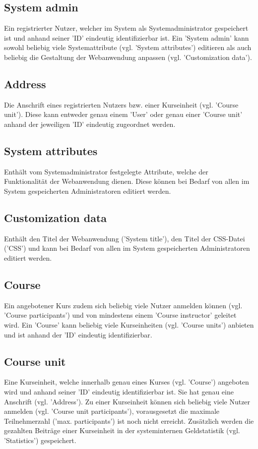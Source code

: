 \subsection{System admin}
Ein registrierter Nutzer, welcher im System als Systemadministrator gespeichert ist und anhand seiner 'ID' eindeutig identifizierbar ist. Ein 'System admin' kann sowohl beliebig viele Systemattribute (vgl. 'System attributes') editieren als auch beliebig die Gestaltung der Webanwendung anpassen (vgl. 'Customization data').

\subsection{Address}
Die Anschrift eines registrierten Nutzers bzw. einer Kurseinheit (vgl. 'Course unit'). Diese kann entweder genau einem 'User' oder genau einer 'Course unit' anhand der jeweiligen 'ID' eindeutig zugeordnet werden.

\subsection{System attributes}
Enthält vom Systemadministrator festgelegte Attribute, welche der Funktionalität der Webanwendung dienen. Diese können bei Bedarf von allen im System gespeicherten Administratoren editiert werden.

\subsection{Customization data}
Enthält den Titel der Webanwendung ('System title'), den Titel der CSS-Datei ('CSS') und kann bei Bedarf von allen im System gespeicherten Administratoren editiert werden.

\subsection{Course}
Ein angebotener Kurs zudem sich beliebig viele Nutzer anmelden können (vgl. 'Course participants') und von mindestens einem 'Course instructor' geleitet wird. Ein 'Course' kann beliebig viele Kurseinheiten (vgl. 'Course units') anbieten und ist anhand der 'ID' eindeutig identifizierbar.

\subsection{Course unit}
Eine Kurseinheit, welche innerhalb genau eines Kurses (vgl. 'Course') angeboten wird und anhand seiner 'ID' eindeutig identifizierbar ist. Sie hat genau eine Anschrift (vgl. 'Address'). Zu einer Kurseinheit können sich beliebig viele Nutzer anmelden (vgl. 'Course unit participants'), vorausgesetzt die maximale Teilnehmerzahl ('max. participants') ist noch nicht erreicht. Zusätzlich werden die gezahlten Beiträge einer Kurseinheit in der systeminternen Geldstatistik (vgl. 'Statistics') gespeichert.

